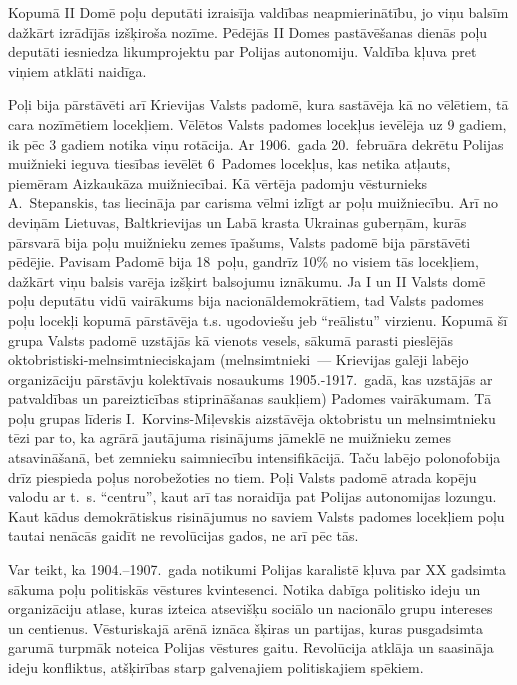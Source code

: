 \documentclass[twoside,a5paper,12pt,fleqn,openany]{extbook}
\begin{document}
Kopumā II Domē poļu deputāti izraisīja valdības neapmierinātību, jo viņu balsīm dažkārt izrādījās izšķiroša nozīme. Pēdējās II Domes pastāvēšanas dienās poļu deputāti iesniedza likumprojektu par Polijas autonomiju. Valdība kļuva pret viņiem atklāti naidīga.

Poļi bija pārstāvēti arī Krievijas Valsts padomē, kura sastāvēja kā no vēlētiem, tā cara nozīmētiem locekļiem. Vēlētos Valsts padomes locekļus ievēlēja uz 9 gadiem, ik pēc 3 gadiem notika viņu rotācija. Ar 1906.~gada 20.~februāra dekrētu Polijas muižnieki ieguva tiesības ievēlēt 6~Padomes locekļus, kas netika atļauts, piemēram Aizkaukāza muižniecībai. Kā vērtēja padomju vēsturnieks A.~Stepanskis, tas liecināja par carisma vēlmi izlīgt ar poļu muižniecību. Arī no deviņām Lietuvas, Baltkrievijas un Labā krasta Ukrainas guberņām, kurās pārsvarā bija poļu muižnieku zemes īpašums, Valsts padomē bija pārstāvēti pēdējie. Pavisam Padomē bija 18~poļu, gandrīz 10\% no visiem tās locekļiem, dažkārt viņu balsis varēja izšķirt balsojumu iznākumu. Ja I un II Valsts domē poļu deputātu vidū vairākums bija nacionāldemokrātiem, tad Valsts padomes poļu locekļi kopumā pārstāvēja t.s. ugodoviešu jeb ``reālistu'' virzienu. Kopumā šī grupa Valsts padomē uzstājās kā vienots vesels, sākumā parasti pieslējās oktobristiski-melnsimtnieciskajam (melnsimtnieki~--- Krievijas galēji labējo organizāciju pārstāvju kolektīvais nosaukums 1905.-1917.~gadā, kas uzstājās ar patvaldības un pareizticības stiprināšanas saukļiem) Padomes vairākumam. Tā poļu grupas līderis I.~Korvins-Miļevskis aizstāvēja oktobristu un melnsimtnieku tēzi par to, ka agrārā jautājuma risinājums jāmeklē ne muižnieku zemes atsavināšanā, bet zemnieku saimniecību intensifikācijā. Taču labējo polonofobija drīz piespieda poļus norobežoties no tiem. Poļi Valsts padomē atrada kopēju valodu ar t.~s. ``centru'', kaut arī tas noraidīja pat Polijas autonomijas lozungu. Kaut kādus demokrātiskus risinājumus no saviem Valsts padomes locekļiem poļu tautai nenācās gaidīt ne revolūcijas gados, ne arī pēc tās.

Var teikt, ka 1904.--1907.~gada notikumi Polijas karalistē kļuva par XX gadsimta sākuma poļu politiskās vēstures kvintesenci. Notika dabīga politisko ideju un organizāciju atlase, kuras izteica atsevišķu sociālo un nacionālo grupu intereses un centienus. Vēsturiskajā arēnā iznāca šķiras un partijas, kuras pusgadsimta garumā turpmāk noteica Polijas vēstures gaitu. Revolūcija atklāja un saasināja ideju konfliktus, atšķirības starp galvenajiem politiskajiem spēkiem.
\end{document}
